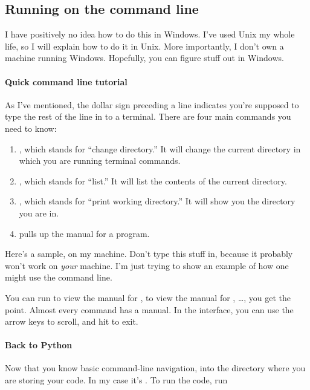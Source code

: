 \subsection{Running on the command line}

I have positively no idea how to do this in Windows. I've used Unix my
whole life, so I will explain how to do it in Unix. More importantly,
I don't own a machine running Windows. Hopefully, you can figure stuff
out in Windows.

\paragraph{Quick command line tutorial}

As I've mentioned, the dollar sign preceding a line indicates you're
supposed to type the rest of the line in to a terminal. There are four
main commands you need to know:

\begin{enumerate}
\item {}, which stands for ``change directory.'' It will change
  the current directory in which you are running terminal commands.
\item {}, which stands for ``list.'' It will list the contents
  of the current directory.
\item {}, which stands for ``print working directory.'' It
  will show you the directory you are in.
\item {} pulls up the manual for a program.
\end{enumerate}

Here's a sample, on my machine. Don't type this stuff in, because it
probably won't work on \emph{your} machine. I'm just trying to show an
example of how one might use the command line.



You can run  to view the manual for ,
 to view the manual for , \dots, you get the
point. Almost every command has a manual. In the  interface,
you can use the arrow keys to scroll, and hit  to exit.

\paragraph{Back to Python}

Now that you know basic command-line navigation,  into the
directory where you are storing your code. In my case it's
. To run the code, run

